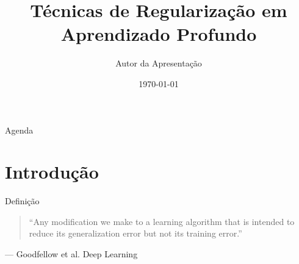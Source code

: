 \documentclass{beamer}
\title{Técnicas de Regularização em Aprendizado Profundo}
\author{Autor da Apresentação}
\date{\today}
\institute
{
  Universidade Federal do Rio de Janeiro\\
  UFRJ/COPPE/PEE
}
\begin{document}
{
\begin{frame}
  \bigskip\bigskip\bigskip\bigskip
  \titlepage
\end{frame}
}

\begin{frame}{Agenda}
  \tableofcontents
\end{frame}

\section{Introdução}

\begin{frame}{Definição}
\begin{quote}
``Any modification we make to a learning algorithm that is intended to reduce its generalization error but not its training error.''
\end{quote}
\vspace{0.5cm}
\raggedleft
--- Goodfellow et al. Deep Learning
\end{frame}
\end{document}
